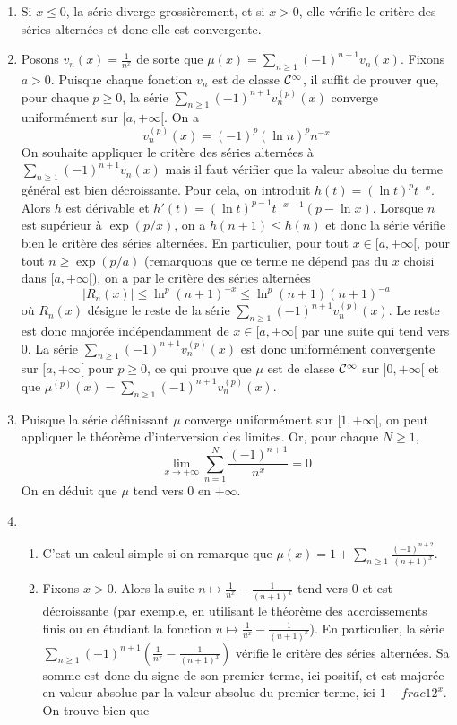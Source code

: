 \begin{enumerate}
    \item Si $x\leqslant 0$, la série diverge grossièrement, et si $x>0$, elle vérifie le critère des séries alternées et donc elle est convergente.

    \item Posons $v_n(x)=\frac{1}{n^x}$ de sorte que $\mu(x)=\sum\limits_{n\geqslant 1}(-1)^{n+1}v_n(x)$. Fixons $a>0$. Puisque chaque fonction $v_n$ est de classe $\mathcal{C}^\infty$, il suffit de prouver que, pour chaque $p\geqslant 0$, la série $\sum\limits_{n\geqslant 1}(-1)^{n+1}v_n^{(p)}(x)$ converge uniformément sur $[a,+\infty[$. On a 
        \[
            v_n^{(p)}(x)=(-1)^p(\ln n)^p n^{-x}
        \]
        On souhaite appliquer le critère des séries alternées à $\sum\limits_{n\geqslant 1}(-1)^{n+1}v_n(x)$ mais il faut vérifier que la valeur absolue du terme général est bien décroissante. Pour cela, on introduit $h(t)=(\ln t)^p t^{-x}$. Alors $h$ est dérivable et $h'(t)=(\ln t)^{p-1}t^{-x-1}(p-\ln x)$. Lorsque $n$ est supérieur à $\exp(p/x)$, on a $h(n+1)\leq h(n)$ et donc la série vérifie bien le critère des séries alternées. En particulier, pour tout $x\in[a,+\infty[$, pour tout $n\geqslant\exp(p/a)$ (remarquons que ce terme ne dépend pas du $x$ choisi dans $[a,+\infty[$), on a par le critère des séries alternées 
        \[
            |R_n(x)|\leqslant \ln^p (n+1)^{-x}\leqslant \ln^p(n+1)(n+1)^{-a}
        \]
        où $R_n(x)$ désigne le reste de la série $\sum\limits_{n\geqslant 1}(-1)^{n+1}v_n^{(p)}(x)$. Le reste est donc majorée indépendamment de $x\in[a,+\infty[$ par une suite qui tend vers 0. La série $\sum\limits_{n\geqslant 1}(-1)^{n+1}v_n^{(p)}(x)$ est donc uniformément convergente sur $[a,+\infty[$ pour $p\geqslant 0$, ce qui prouve que $\mu$ est de classe $\mathcal{C}^\infty$ sur $]0,+\infty[$ et que $\mu^{(p)}(x)=\sum\limits_{n\geqslant 1}(-1)^{n+1}v_n^{(p)}(x)$.
    \item Puisque la série définissant $\mu$ converge uniformément sur $[1,+\infty[$, on peut appliquer le théorème d'interversion des limites. Or, pour chaque $N\geqslant 1$, 
        \[
            \lim_{x\to+\infty}\sum_{n=1}^N \frac{(-1)^{n+1}}{n^x}=0
        \]
        On en déduit que $\mu$ tend vers 0 en $+\infty$.
        \item  
            \begin{enumerate}
                \item C'est un calcul simple si on remarque que $\mu(x)=1+\sum\limits_{n\geqslant 1}\frac{(-1)^{n+2}}{(n+1)^x}.$
                \item Fixons $x>0$. Alors la suite $n\mapsto\frac{1}{n^x}-\frac{1}{(n+1)^x}$ tend vers 0 et est décroissante (par exemple, en utilisant le théorème des accroissements finis ou en étudiant la fonction $u\mapsto \frac{1}{u^x}-\frac{1}{(u+1)^x}$). En particulier, la série $\sum\limits_{n\geqslant 1}(-1)^{n+1}\left(\frac{1}{n^x}-\frac{1}{(n+1)^x}\right)$ vérifie le critère des séries alternées. Sa somme est donc du signe de son premier terme, ici positif, et est majorée en valeur absolue par la valeur absolue du premier terme, ici $1-frac{1}{2^x}$. On trouve bien que

\end{enumerate}
\end{enumerate}
